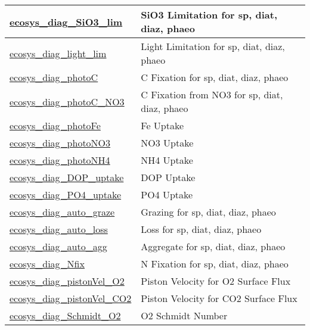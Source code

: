 {\begin{center}
\begin{longtable}{| p{2.0in} | p{4.0in} |}
    \hyperref[subsec:var_sec_forcing_ecosys_diag_SiO3_lim]{ecosys\_diag\_SiO3\_lim} & SiO3 Limitation for sp, diat, diaz, phaeo \\
    \hline
    \hyperref[subsec:var_sec_forcing_ecosys_diag_light_lim]{ecosys\_diag\_light\_lim} & Light Limitation for sp, diat, diaz, phaeo \\
    \hline
    \hyperref[subsec:var_sec_forcing_ecosys_diag_photoC]{ecosys\_diag\_photoC} & C Fixation for sp, diat, diaz, phaeo \\
    \hline
    \hyperref[subsec:var_sec_forcing_ecosys_diag_photoC_NO3]{ecosys\_diag\_photoC\_NO3} & C Fixation from NO3 for sp, diat, diaz, phaeo \\
    \hline
    \hyperref[subsec:var_sec_forcing_ecosys_diag_photoFe]{ecosys\_diag\_photoFe} & Fe Uptake \\
    \hline
    \hyperref[subsec:var_sec_forcing_ecosys_diag_photoNO3]{ecosys\_diag\_photoNO3} & NO3 Uptake \\
    \hline
    \hyperref[subsec:var_sec_forcing_ecosys_diag_photoNH4]{ecosys\_diag\_photoNH4} & NH4 Uptake \\
    \hline
    \hyperref[subsec:var_sec_forcing_ecosys_diag_DOP_uptake]{ecosys\_diag\_DOP\_uptake} & DOP Uptake \\
    \hline
    \hyperref[subsec:var_sec_forcing_ecosys_diag_PO4_uptake]{ecosys\_diag\_PO4\_uptake} & PO4 Uptake \\
    \hline
    \hyperref[subsec:var_sec_forcing_ecosys_diag_auto_graze]{ecosys\_diag\_auto\_graze} & Grazing for sp, diat, diaz, phaeo \\
    \hline
    \hyperref[subsec:var_sec_forcing_ecosys_diag_auto_loss]{ecosys\_diag\_auto\_loss} & Loss for sp, diat, diaz, phaeo \\
    \hline
    \hyperref[subsec:var_sec_forcing_ecosys_diag_auto_agg]{ecosys\_diag\_auto\_agg} & Aggregate for sp, diat, diaz, phaeo \\
    \hline
    \hyperref[subsec:var_sec_forcing_ecosys_diag_Nfix]{ecosys\_diag\_Nfix} & N Fixation for sp, diat, diaz, phaeo \\
    \hline
    \hyperref[subsec:var_sec_forcing_ecosys_diag_pistonVel_O2]{ecosys\_diag\_pistonVel\_O2} & Piston Velocity for O2 Surface Flux \\
    \hline
    \hyperref[subsec:var_sec_forcing_ecosys_diag_pistonVel_CO2]{ecosys\_diag\_pistonVel\_CO2} & Piston Velocity for CO2 Surface Flux \\
    \hline
    \hyperref[subsec:var_sec_forcing_ecosys_diag_Schmidt_O2]{ecosys\_diag\_Schmidt\_O2} & O2 Schmidt Number \\

\end{longtable}
\end{center}}
